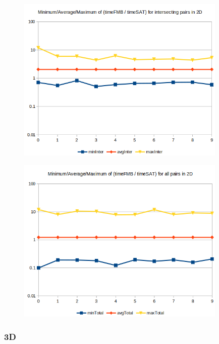 \documentclass[12pt, a4paper]{article}
\begin{document}
\begin{center}
\begin{figure}[H]
\centering\includegraphics[width=10cm]{./2dinter.png}\\
\end{figure}
\end{center}

\begin{center}
\begin{figure}[H]
\centering\includegraphics[width=10cm]{./2dtotal.png}\\
\end{figure}
\end{center}

\subsubsection{3D}
\end{document}
